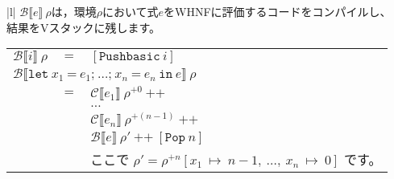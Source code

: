 \documentclass{jarticle}
\begin{document}
\begin{tabular} {|l|} \hline
	$\mathcal{B} \llbracket e \rrbracket ~ \rho$は，環境$\rho$において式$e$をWHNFに評価するコードをコンパイルし、 \\
	結果をVスタックに残します。                                                                                   \\
	\begin{tabular}{r c l}
		$\mathcal{B} \llbracket i \rrbracket ~ \rho$                             & $=$ & $\left[\texttt{Pushbasic} ~ i \right]$                                                                                                                                                       \\
		\multicolumn{3}{l}{$\mathcal{B} \llbracket \texttt{let} ~ x_1 ~ \texttt{=} ~ e_1\texttt{;} ~  \ldots \texttt{;} ~ x_n ~ \texttt{=} ~ e_n ~ \texttt{in} ~ e \rrbracket ~ \rho$}                                                                                                \\
		                                                                         & $=$ & $\mathcal{C} \llbracket e_1 \rrbracket ~ \rho^{+0} ~ \texttt{++}$                                                                                                                            \\
		                                                                         &     & $\ldots$                                                                                                                                                                                     \\
		                                                                         &     & $\mathcal{C} \llbracket e_n \rrbracket ~ \rho^{+(n - 1)} ~ \texttt{++}$                                                                                                                      \\
		                                                                         &     & $\mathcal{B} \llbracket e \rrbracket ~ \rho' ~ \texttt{++} ~ \left[\texttt{Pop} ~ n\right]$                                                                                                  \\
		                                                                         &     & ここで $\rho' = \rho^{+n} \left[x_1 ~ \mapsto ~ n - 1, ~ \ldots , ~ x_n ~ \mapsto ~ 0\right]$ です。                                                                                         \\

\end{tabular}
\end{tabular}
\end{document}
